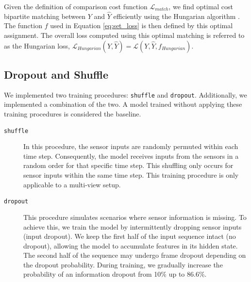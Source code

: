 Given the definition of comparison cost function $\mathcal{L}_{match}$, we find optimal cost bipartite matching between $ Y $ and $ \hat{Y} $ efficiently using the Hungarian algorithm \cite{kuhnHungarianMethodAssignment1955}. The function $f$ used in Equation \ref{eq:set_loss} is then defined by this optimal assignment. The overall loss computed using this optimal matching is referred to as the Hungarian loss, $\mathcal{L}_{Hungarian}(Y, \hat{Y}) = \mathcal{L}(Y, \hat{Y}, f_{Hungarian})$.

\subsection{Dropout and Shuffle} \label{Methods:Training:DropoutAndShuffle}

We implemented two training procedures: \texttt{shuffle} and \texttt{dropout}. Additionally, we implemented a combination of the two. A model trained without applying these training procedures is considered the baseline.

\begin{description}
    \item[\texttt{shuffle}] In this procedure, the sensor inputs are randomly permuted within each time step. Consequently, the model receives inputs from the sensors in a random order for that specific time step. This shuffling only occurs for sensor inputs within the same time step. This training procedure is only applicable to a multi-view setup.

    \item[\texttt{dropout}] This procedure simulates scenarios where sensor information is missing. To achieve this, we train the model by intermittently dropping sensor inputs (input dropout). We keep the first half of the input sequence intact (no dropout), allowing the model to accumulate features in its hidden state. The second half of the sequence may undergo frame dropout depending on the dropout probability. During training, we gradually increase the probability of an information dropout from 10\% up to 86.6\%.
\end{description}



